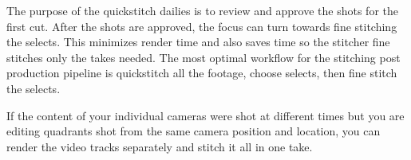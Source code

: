 \begin{fullwidth}
The purpose of the quickstitch dailies is to review and approve the shots for the first cut. After the shots are approved, the focus can turn towards fine stitching the selects. This minimizes render time and also saves time so the stitcher fine stitches only the takes needed. The most optimal workflow for the stitching post production pipeline is quickstitch all the footage, choose selects, then fine stitch the selects.

\tip If the content of your individual cameras were shot at different times but you are editing quadrants shot from the same camera position and location, you can render the video tracks separately and stitch it all in one take.

\clearpage
\end{fullwidth}